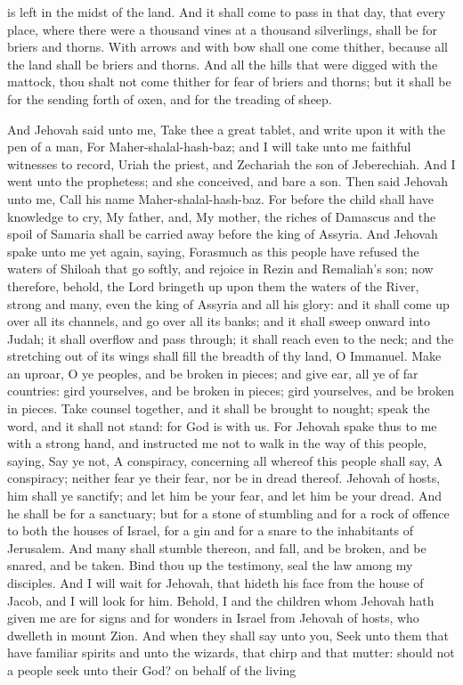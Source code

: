 is left in the midst of the land.  And it shall come to pass in that day, that every place, where there were a thousand vines at a thousand silverlings, shall be for briers and thorns. With arrows and with bow shall one come thither, because all the land shall be briers and thorns. And all the hills that were digged with the mattock, thou shalt not come thither for fear of briers and thorns; but it shall be for the sending forth of oxen, and for the treading of sheep. 

And Jehovah said unto me, Take thee a great tablet, and write upon it with the pen of a man, For Maher-shalal-hash-baz; and I will take unto me faithful witnesses to record, Uriah the priest, and Zechariah the son of Jeberechiah. And I went unto the prophetess; and she conceived, and bare a son. Then said Jehovah unto me, Call his name Maher-shalal-hash-baz. For before the child shall have knowledge to cry, My father, and, My mother, the riches of Damascus and the spoil of Samaria shall be carried away before the king of Assyria.  And Jehovah spake unto me yet again, saying, Forasmuch as this people have refused the waters of Shiloah that go softly, and rejoice in Rezin and Remaliah’s son; now therefore, behold, the Lord bringeth up upon them the waters of the River, strong and many, even the king of Assyria and all his glory: and it shall come up over all its channels, and go over all its banks; and it shall sweep onward into Judah; it shall overflow and pass through; it shall reach even to the neck; and the stretching out of its wings shall fill the breadth of thy land, O Immanuel.  Make an uproar, O ye peoples, and be broken in pieces; and give ear, all ye of far countries: gird yourselves, and be broken in pieces; gird yourselves, and be broken in pieces. Take counsel together, and it shall be brought to nought; speak the word, and it shall not stand: for God is with us. For Jehovah spake thus to me with a strong hand, and instructed me not to walk in the way of this people, saying, Say ye not, A conspiracy, concerning all whereof this people shall say, A conspiracy; neither fear ye their fear, nor be in dread thereof. Jehovah of hosts, him shall ye sanctify; and let him be your fear, and let him be your dread. And he shall be for a sanctuary; but for a stone of stumbling and for a rock of offence to both the houses of Israel, for a gin and for a snare to the inhabitants of Jerusalem. And many shall stumble thereon, and fall, and be broken, and be snared, and be taken.  Bind thou up the testimony, seal the law among my disciples. And I will wait for Jehovah, that hideth his face from the house of Jacob, and I will look for him. Behold, I and the children whom Jehovah hath given me are for signs and for wonders in Israel from Jehovah of hosts, who dwelleth in mount Zion.  And when they shall say unto you, Seek unto them that have familiar spirits and unto the wizards, that chirp and that mutter: should not a people seek unto their God? on behalf of the living 